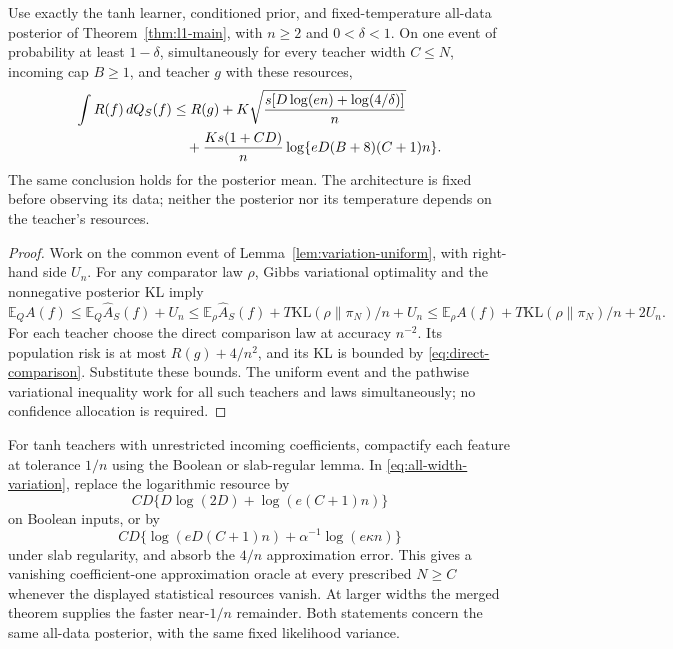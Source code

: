 \begin{theorem}
\label{thm:all-width-variation}
Use exactly the tanh learner, conditioned prior, and fixed-temperature
all-data posterior of Theorem~\ref{thm:l1-main}, with $n\ge2$ and
$0<\delta<1$. On one event of
probability at least $1-\delta$, simultaneously for every teacher width
$C\le N$, incoming cap $B\ge1$, and teacher $g$ with these resources,
\begin{align}
 \int R(f)\,dQ_S(f)
 &\le R(g)+K\sqrt{\frac{s[D\log(en)+\log(4/\delta)]}{n}}\notag\\
 &\quad+\frac{Ks(1+CD)}n\log\{eD(B+8)(C+1)n\}.
 \label{eq:all-width-variation}
\end{align}
The same conclusion holds for the posterior mean. The architecture is
fixed before observing its data; neither the posterior nor its
temperature depends on the teacher's resources.
\end{theorem}
\begin{proof}
Work on the common event of Lemma~\ref{lem:variation-uniform}, with
right-hand side $U_n$. For any comparator law $\rho$, Gibbs variational
optimality and the nonnegative posterior KL imply
\[
 \mathbb E_Q A(f)\le\mathbb E_Q\widehat A_S(f)+U_n
 \le\mathbb E_\rho\widehat A_S(f)+T\mathrm{KL}(\rho\|\pi_N)/n+U_n
 \le\mathbb E_\rho A(f)+T\mathrm{KL}(\rho\|\pi_N)/n+2U_n.
\]
For each teacher choose the direct comparison law at accuracy $n^{-2}$.
Its population risk is at most $R(g)+4/n^2$, and its KL is bounded by
\eqref{eq:direct-comparison}. Substitute these bounds. The uniform
event and the pathwise variational inequality work for all such
teachers and laws simultaneously; no confidence allocation is required.
\end{proof}

For tanh teachers with unrestricted incoming coefficients, compactify
each feature at tolerance $1/n$ using the Boolean or slab-regular
lemma. In \eqref{eq:all-width-variation}, replace the logarithmic
resource by
\[
 CD\{D\log(2D)+\log(e(C+1)n)\}
\]
on Boolean inputs, or by
\[
 CD\{\log(eD(C+1)n)+\alpha^{-1}\log(e\kappa n)\}
\]
under slab regularity, and absorb the $4/n$ approximation error.
This gives a vanishing coefficient-one approximation oracle at every
prescribed $N\ge C$ whenever the displayed statistical resources
vanish. At larger widths the merged theorem supplies the faster
near-$1/n$ remainder. Both statements concern the same all-data
posterior, with the same fixed likelihood variance.

